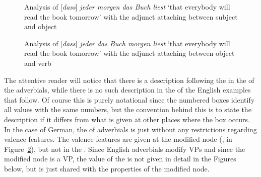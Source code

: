 \begin{figure}

\caption{\label{fig-j-m-b-l}Analysis of [\emph{dass}] \emph{jeder morgen das Buch liest} `that everybody will read the
  book tomorrow' with the adjunct attaching between subject and object}
\end{figure}


\begin{figure}
\caption{\label{fig-j-b-m-l}Analysis of [\emph{dass}] \emph{jeder das Buch morgen liest} `that everybody will read the
  book tomorrow' with the adjunct attaching between object and verb}
\end{figure}
The attentive reader will notice that there is a description following the  in the \modv of
the adverbials, while there is no such description in the \modvs of the English examples that
follow. Of course this is purely notational since the numbered boxes identify all values with the
same numbers, but the convention behind this is to state the description if it differs from what is
given at other places where the box occurs. In the case of German, the \modv of adverbials is just
 without any restrictions regarding valence features. The valence features are given at
the modified node (\eg \spr \eliste, \comps {} in
Figure~\ref{fig-j-b-m-l}), but not in the \modv. Since English adverbials modify VPs and since the
modified node is a VP, the value of the \modv is not given in detail in the Figures below, but is just shared with the
properties of the modified node.


